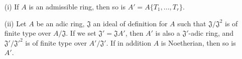 \begin{prop}[7.5.4]
\label{prop-0.7.5.4}
\medskip\noindent
\begin{itemize}
  \item[{\rm(i)}] If $A$ is an admissible ring, then so is $A'=A\{T_1,\dots,T_r\}$.
  \item[{\rm(ii)}] Let $A$ be an adic ring, $\mathfrak{J}$ an ideal of definition for
    $A$ such that $\mathfrak{J}/\mathfrak{J}^2$ is of finite type
    over $A/\mathfrak{J}$. If we set $\mathfrak{J}'=\mathfrak{J}A'$, then $A'$ is also a
    $\mathfrak{J}'$-adic ring, and $\mathfrak{J}'/{\mathfrak{J}'}^2$ is of finite type over
    $A'/\mathfrak{J}'$. If in addition $A$ is Noetherian, then so is $A'$.
\end{itemize}
\end{prop}

